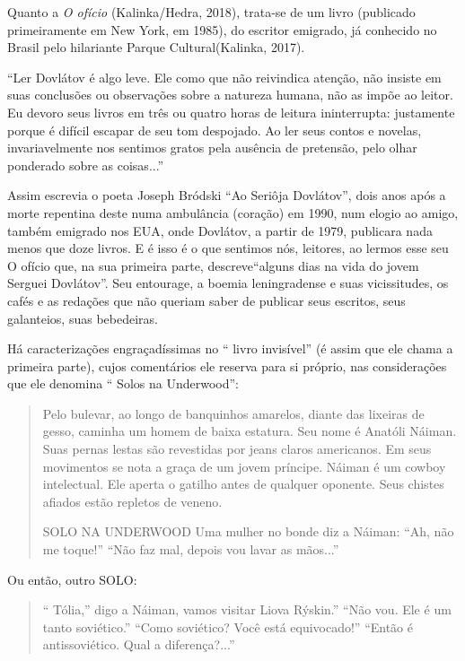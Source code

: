 Quanto a \emph{O ofício} (Kalinka/Hedra, 2018), trata-se de um livro (publicado primeiramente em New York, em 1985), do escritor emigrado, já conhecido no Brasil pelo hilariante Parque Cultural(Kalinka, 2017).

“Ler Dovlátov é algo leve. Ele como que não reivindica atenção, não insiste em suas conclusões ou observações sobre a natureza humana, não as impõe ao leitor. Eu devoro seus livros em três ou quatro horas de leitura ininterrupta: justamente porque é difícil escapar de seu tom despojado. Ao ler seus contos e novelas, invariavelmente nos sentimos gratos pela ausência de pretensão, pelo olhar ponderado sobre as coisas...”

Assim escrevia o poeta Joseph Bródski  “Ao Seriôja Dovlátov”, dois anos após a morte repentina deste numa ambulância (coração) em 1990, num elogio ao amigo, também emigrado nos EUA, onde Dovlátov, a partir de 1979, publicara nada menos que doze livros. E é isso é o que sentimos nós, leitores, ao lermos esse seu O ofício que, na sua primeira parte, descreve“alguns dias na vida do jovem Serguei Dovlátov”. Seu entourage, a boemia leningradense e suas vicissitudes, os cafés e as redações que não queriam saber de publicar seus escritos, seus galanteios, suas bebedeiras. 

Há caracterizações engraçadíssimas no “ livro invisível” (é assim que ele chama a primeira parte), cujos comentários ele reserva para si próprio, nas considerações que ele denomina “ Solos na Underwood”: 

\begin{quote}
Pelo bulevar, ao longo de banquinhos amarelos, diante das lixeiras de gesso, caminha um homem de baixa estatura. Seu nome é Anatóli Náiman.
Suas pernas lestas são revestidas por jeans claros americanos. Em seus movimentos se nota a graça de um jovem príncipe. Náiman é um cowboy intelectual. Ele aperta o gatilho antes de qualquer oponente. Seus chistes afiados estão repletos de veneno.

  SOLO NA UNDERWOOD
Uma mulher no bonde diz a Náiman:
“Ah, não me toque!”
“Não faz mal, depois vou lavar as mãos...”
\end{quote}

Ou então, outro  SOLO:

\begin{quote}
“ Tólia,” digo a Náiman, vamos visitar Liova Rýskin.”
“Não vou. Ele é um  tanto soviético.”
“Como soviético? Você está equivocado!”
“Então é antissoviético. Qual a diferença?...”
\end{quote}

